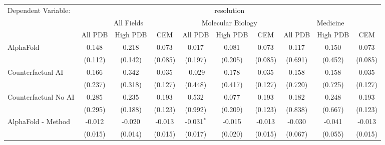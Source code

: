 \begingroup
\centering
\begin{tabular}{lccccccccc}
   \tabularnewline \midrule \midrule
   Dependent Variable: & \multicolumn{9}{c}{resolution}\\
 & \multicolumn{3}{c}{All Fields} & \multicolumn{3}{c}{Molecular Biology} & \multicolumn{3}{c}{Medicine} \\
\cmidrule(lr){2-7} \cmidrule(lr){5-10} \cmidrule(lr){8-7}
 & \multicolumn{1}{c}{All PDB} & \multicolumn{1}{c}{High PDB} & \multicolumn{1}{c}{CEM} & \multicolumn{1}{c}{All PDB} & \multicolumn{1}{c}{High PDB} & \multicolumn{1}{c}{CEM} & \multicolumn{1}{c}{All PDB} & \multicolumn{1}{c}{High PDB} & \multicolumn{1}{c}{CEM} \\
\cmidrule(lr){2-3} \cmidrule(lr){3-4} \cmidrule(lr){4-5} \cmidrule(lr){5-6} \cmidrule(lr){6-7} \cmidrule(lr){7-8} \cmidrule(lr){8-9} \cmidrule(lr){9-10} \cmidrule(lr){10-3}
   AlphaFold                                                   & 0.148         & 0.218         & 0.073         & 0.017          & 0.081         & 0.073         & 0.117   & 0.150     & 0.073\\   
                                                               & (0.112)       & (0.142)       & (0.085)       & (0.197)        & (0.205)       & (0.085)       & (0.691) & (0.452)   & (0.085)\\   
   Counterfactual AI                                           & 0.166         & 0.342         & 0.035         & -0.029         & 0.178         & 0.035         & 0.158   & 0.158     & 0.035\\   
                                                               & (0.237)       & (0.318)       & (0.127)       & (0.448)        & (0.417)       & (0.127)       & (0.720) & (0.725)   & (0.127)\\   
   Counterfactual No AI                                        & 0.285         & 0.235         & 0.193         & 0.532          & 0.077         & 0.193         & 0.182   & 0.248     & 0.193\\   
                                                               & (0.295)       & (0.188)       & (0.123)       & (0.992)        & (0.209)       & (0.123)       & (0.838) & (0.667)   & (0.123)\\   
   AlphaFold - Method                                          & -0.012        & -0.020        & -0.013        & -0.031$^{*}$   & -0.015        & -0.013        & -0.030  & -0.041    & -0.013\\   
                                                               & (0.015)       & (0.014)       & (0.015)       & (0.017)        & (0.020)       & (0.015)       & (0.067) & (0.055)   & (0.015)\\   

\end{tabular}
